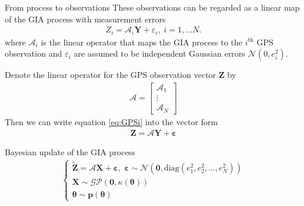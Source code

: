 \documentclass{beamer}
\begin{document}
\begin{frame}{From process to observations}
These observations can be regarded as a linear map of the GIA process with measurement errors
\begin{align}\label{eq:GPSi}
Z_i = \bm{\mathcal{A}}_i\bm{Y} + \varepsilon_i, \; i = 1,\dots N.
\end{align} 
where $\bm{\mathcal{A}}_i$ is the linear operator that maps the GIA process to the $i^{\mbox{th}}$ GPS observation and $\varepsilon_i$ are assumed to be independent Gaussian errors $\mathcal{N}(0, e_i^2)$. 

Denote the linear operator for the GPS observation vector $\bm{Z}$ by 
\begin{align*}
\bm{\mathcal{A}} = \left[\begin{array}{c}
 \bm{\mathcal{A}}_1\\ \vdots \\ \bm{\mathcal{A}}_N \end{array} \right]
\end{align*}
Then we can write equation \ref{eq:GPSi} into the vector form
\begin{align}\label{eq:GPS}
\bm{Z} = \bm{\mathcal{A}}\bm{Y} + \bm{\varepsilon} 
\end{align}

\end{frame}

\begin{frame}{Bayesian update of the GIA process}
\begin{align}
\left\{ \begin{array}{l}
\bm{\tilde{Z}} = \bm{\mathcal{A}}\bm{X} + \bm{\varepsilon}, \; 
\bm{\varepsilon} \sim \mathcal{N} (\bm{0}, \mbox{diag}(e_1^2, e_2^2, \dots, e_N^2)) \\
\bm{X} \sim \mathcal{GP}(\bm{0}, \kappa(\bm{\theta})) \\
\bm{\theta} \sim \bm{p}(\bm{\theta})
\end{array} \right.
\end{align}
\end{frame}


\end{document}
